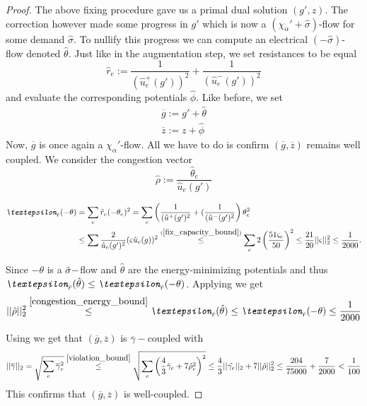 \begin{proof}
The above fixing procedure gave us a primal dual solution $(g', z)$. The correction however made some progress in $g'$ which is now a $(\chi_\alpha'+\hat{\sigma})$-flow for some demand $\hat{\sigma}$. To nullify this progress we can compute an electrical $(-\hat{\sigma})$-flow denoted $\hat{\theta}$. Just like in the augmentation step, we set resistances to be equal
\[ \hat r_e := \frac{1}{(\hat u_e^+(g'))^2}+\frac{1}{(\hat u_e^-(g'))^2} \]
and evaluate the corresponding potentials $\hat{\phi}$. Like before, we set
\begin{equation}
\begin{split}
\overline{g} := g'+\hat{\theta} \\
\overline{z} := z+\hat{\phi}
\end{split}
\end{equation}
Now, $\overline{g}$ is once again a $\chi_\alpha'$-flow. All we have to do is confirm $(\overline{g}, \overline{z})$ remains well coupled.
We consider the congestion vector
\[ \hat{\rho} := \frac{\hat{\theta}_e}{\hat u_e(g')} \]

\begin{equation}
\begin{split}
\emph{\textepsilon}_{\hat r}(-\theta)
&= \sum_e\hat r_e(-\theta_e)^2
= \sum_e\left(\frac{1}{(\hat u^+(g')^2}+(\frac{1}{(\hat u^-(g')^2}\right)\theta_e^2 \\
&\le \sum \frac{2}{\hat u_e(g')^2}(\varsigma\hat u_e(g))^2
\stackrel{(\ref{fix_capacity_bound})}{\le} \sum_e2\left(\frac{51\varsigma_e}{50}\right)^2
\le \frac{21}{20}||\varsigma||_2^2
\le \frac{1}{2000}.
\end{split}
\end{equation}

Since $-\theta$ is a $\-\hat{\sigma}-$flow and $\hat{\theta}$ are the energy-minimizing potentials and thus $ \emph{\textepsilon}_{\hat r}(\hat{\theta}) \le \emph{\textepsilon}_{\hat r}(-\theta) $.
Applying  we get
\[ ||\hat{\rho}||_2^2 \stackrel{\ref{congestion_energy_bound}}{\le} \emph{\textepsilon}_{\hat r}(\hat{\theta}) \le \emph{\textepsilon}_{\hat r}(-\theta) \le \frac{1}{2000} \]

Using  we get that $(\overline{g},\overline{z})$ is $\overline{\gamma}-$coupled with
\[
||\overline{\gamma}||_2
= \sqrt{\sum_e\overline{\gamma}_e^2}
\stackrel{\ref{violation_bound}}{\le} \sqrt{\sum_e\left(\frac{4}{3}\tilde{\gamma}_e+7\hat{\rho}_e^2\right)^2}
\le \frac{4}{3}||\hat{\gamma_e}||_2+7||\hat{\rho}||_2^2
\le \frac{204}{75000}+\frac{7}{2000} < \frac{1}{100}
\]
This confirms that $(\overline{g},\overline{z})$ is well-coupled.
\end{proof}

